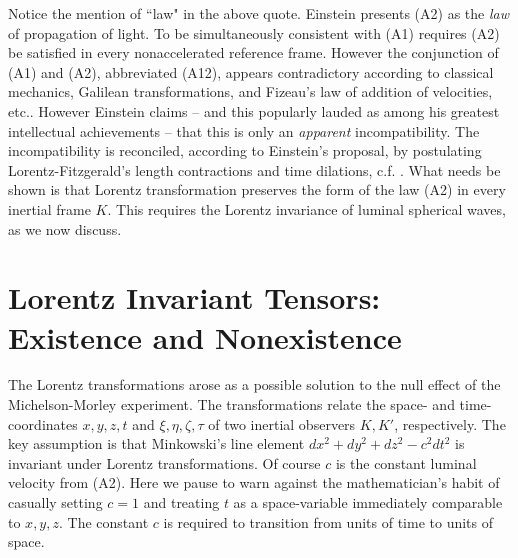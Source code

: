 \documentclass[12pt]{amsart}
\theoremstyle{definition}
\theoremstyle{remark}
\begin{document}
Notice the mention of ``law" in the above quote. Einstein presents (A2) as the \emph{law} of propagation of light. To be simultaneously consistent with (A1) requires (A2) be satisfied in every nonaccelerated reference frame. However the conjunction of (A1) and (A2), abbreviated (A12), appears contradictory according to classical mechanics, Galilean transformations, and Fizeau's law of addition of velocities, etc.. However Einstein claims -- and this popularly lauded as among his greatest intellectual achievements -- that this is only an \emph{apparent} incompatibility. The incompatibility is reconciled, according to Einstein's proposal, by postulating Lorentz-Fitzgerald's length contractions and time dilations, c.f. \cite[Ch.XIV]{michelson}. What needs be shown is that Lorentz transformation preserves the form of the law (A2) in every inertial frame $K$. This requires the Lorentz invariance of luminal spherical waves, as we now discuss.   








\section{Lorentz Invariant Tensors: Existence and Nonexistence}\label{li}

The Lorentz transformations arose as a possible solution to the null effect of the Michelson-Morley experiment. The transformations relate the space- and time-coordinates $x,y,z,t$ and $\xi, \eta, \zeta, \tau$ of two inertial observers $K, K'$, respectively. The key assumption is that Minkowski's line element $dx^2+dy^2+dz^2-c^2dt^2$ is invariant under Lorentz transformations. Of course $c$ is the constant luminal velocity from (A2). Here we pause to warn against the mathematician's habit of casually setting $c=1$ and treating $t$ as a space-variable immediately comparable to $x,y,z$. The constant $c$ is required to transition from units of time to units of space.  %
\end{document}
